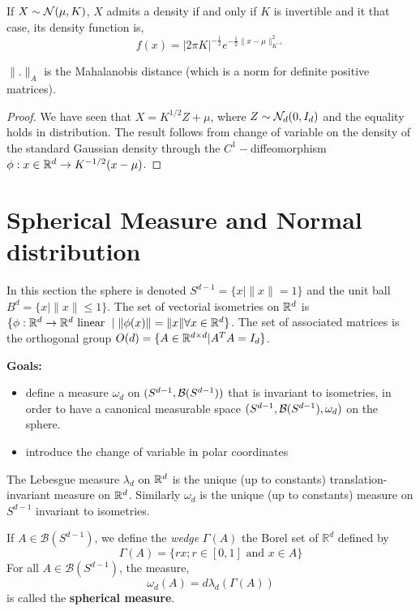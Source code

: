\documentclass{article}
\begin{document}
\begin{prop}
  If $X \sim \mathcal{N}(\mu,K)$, $X$ admits a density if and only if $K$ is
  invertible and it that case, its density function is,
  $$f(x)=|2 \pi K|^{-\frac{1}{2}} e^{-\frac{1}{2}\|x - \mu\|_{K^{-1}}^{2}}$$
\end{prop}

$\|.\|_A$ is the Mahalanobis distance (which is a norm for  definite positive matrices).

\begin{proof}
  We have seen that $X = K^{1/2}Z + \mu$, where $Z \sim \mathcal{N}_d(0,I_d)$ and the equality holds in
  distribution. The result follows from change of variable on the density of the
  standard Gaussian density through the $C^1-$diffeomorphism $\phi:
  x \in \mathbb{R}^{d} \to K^{-1/2}(x - \mu)$.
\end{proof}

\section{Spherical Measure and Normal distribution}

In this section the sphere is denoted $S^{d-1} = \{x \mid \|x\|=1\}$ and the
unit ball $B^d = \{x \mid \|x\| \leq 1\}$. The set of vectorial isometries on
$\mathbb{R}^{d}$ is $\{\phi:\mathbb{R}^{d} \to \mathbb{R}^{d} \text{ linear } \mid \|\phi(x)\|=\|x\| \forall x
\in \mathbb{R}^{d} \}$. The set of associated matrices is the orthogonal group $O(d) = \{A
\in \mathbb{R}^{d \times d} | A^TA = I_d\}$. 

\textbf{Goals:}
\begin{itemize}
\item define a measure $\omega_d$ on
  $(S^{d-1},\mathcal{B}(S^{d-1}))$ that is invariant to isometries, in order to have a
  canonical measurable space $(S^{d-1},\mathcal{B}(S^{d-1}), \omega_d)$ on the sphere.
\item introduce the change of variable in polar coordinates
\end{itemize}

The Lebesgue measure $\lambda_d$ on $\mathbb{R}^{d}$ is the unique (up to constants)
translation-invariant measure on $\mathbb{R}^{d}$. Similarly $\omega_d$ is the unique (up to
constants) measure on $S^{d-1}$ invariant to isometries.

\begin{definition}
  If $A \in \mathcal{B}\left(S^{d-1}\right)$, we define the \emph{wedge} $\Gamma(A)$ the Borel set
  of $\mathbb{R}^{d}$ defined by
  $$
  \Gamma(A)=\{r x ; r \in[0,1] \text { and } x \in A\}
  $$
  For all $A \in \mathcal{B}\left(S^{d-1}\right)$, the measure,
  $$
  \omega_{d}(A)=d \lambda_{d}(\Gamma(A))
  $$
  is called the \textbf{spherical measure}. 
\end{definition}
\end{document}
